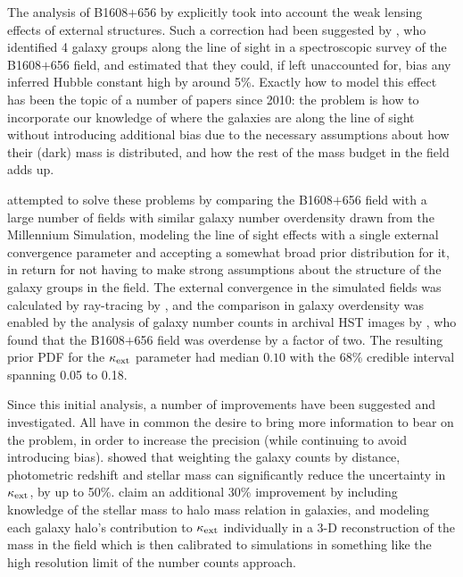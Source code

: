 

The analysis of B1608$+$656 by \citet{Suy++10} explicitly took into
account the weak lensing effects of external structures.  Such a
correction had been suggested by \citet{Fas++06b}, who identified 4
galaxy groups along the line of sight in a spectroscopic survey of the
B1608$+$656 field, and estimated that they could, if left unaccounted
for, bias any inferred Hubble constant high by around 5\%. Exactly how
to  model this effect has been the topic of a number of papers since
2010: the problem is  how to incorporate our knowledge of where the
galaxies are along the line of sight without introducing additional
bias due to the necessary assumptions about how their (dark) mass is
distributed, and how the rest of the mass budget in the field adds up.

\citet{Suy++10} attempted to solve these problems by comparing the
B1608$+$656 field with a large number of fields with similar  galaxy
number overdensity drawn from the Millennium Simulation, modeling the
line of sight effects with a single external convergence parameter and
accepting a somewhat broad prior distribution for it, in return for not
having to make  strong assumptions about the structure of the galaxy
groups in the field. The external convergence in the simulated fields
was calculated by ray-tracing by \citet{Hil++09}, and the
comparison in galaxy overdensity was enabled by the analysis of galaxy
number counts in archival HST images by \citet{FKW11}, who found that
the B1608$+$656 field was overdense by a factor of two. The resulting
prior PDF for the $\kappa_{\rm ext}$ parameter had median $0.10$ with
the 68\% credible interval spanning 0.05 to 0.18.

Since this initial analysis, a number of improvements have been
suggested and investigated. All have in common the desire to bring more
information  to bear on the problem, in order to increase the precision
(while  continuing to avoid introducing bias). \citet{Gre++13} showed
that weighting the galaxy counts by distance, photometric redshift and
stellar mass  can significantly reduce the uncertainty in $\kappa_{\rm
ext}$, by up to 50\%. \citet{CollettEtal2013} claim an additional 30\%
improvement  by including knowledge of the stellar mass to halo mass
relation in galaxies,  and modeling each galaxy halo's contribution to
$\kappa_{\rm ext}$ individually in a  3-D reconstruction of the mass in
the field which is then calibrated to simulations in something like the
high resolution limit of the number counts approach.







